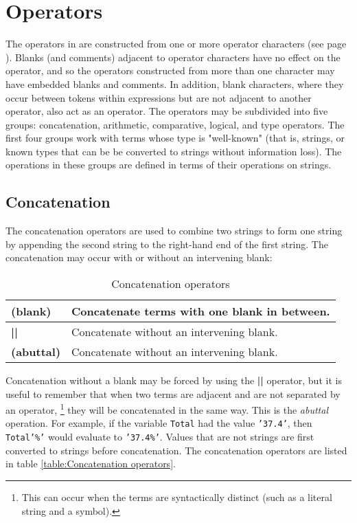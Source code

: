 \section{Operators}\label{refops}
The operators in \nr{} are constructed from one or more
operator characters (see page \pageref{refopers}).
Blanks (and comments) adjacent to operator characters have no effect on
the operator, and so the operators constructed from more than one
character may have embedded blanks and comments.
In addition, blank characters, where they occur between tokens within
expressions but are not adjacent to another operator, also act as an
operator.
 The operators may be subdivided into five groups: concatenation,
arithmetic, comparative, logical, and type operators.  The first four
groups work with terms whose type is "well-known" (that is,
strings, or known types that can be be converted to strings without
information loss).  The operations in these groups are defined in terms
of their operations on strings.
\subsection{Concatenation}
The concatenation operators are used to combine two strings to form
one string by appending the second string to the right-hand end of the
first string.  The concatenation may occur with or without an
intervening blank:
\begin{table}\caption{Concatenation operators}\label{table:Concatenation operators}
\begin{tabularx}{\textwidth}{>{\bfseries}lX}
\toprule
(blank)&Concatenate terms with one blank in between.
\\\midrule
||&Concatenate without an intervening blank.
\\\midrule
(abuttal)\label{refabut}&Concatenate without an intervening blank.
\\\bottomrule
\end{tabularx}
\end{table}
 Concatenation without a blank may be forced by using
the \textbf{||} operator, but it is useful to remember that
when two terms are adjacent and are not separated by an operator,
\footnote{
This can occur when the terms are syntactically distinct (such as a
literal string and a symbol).
}
they will be concatenated in the same way.
This is the \emph{abuttal} operation.
For example, if the variable \texttt{Total} had the value
\texttt{'37.4'}, then \texttt{Total'\%'} would evaluate to \texttt{'37.4\%'}.  
 Values that are not strings are first converted to strings before
concatenation. The concatenation operators are listed in table \ref{table:Concatenation operators}.
